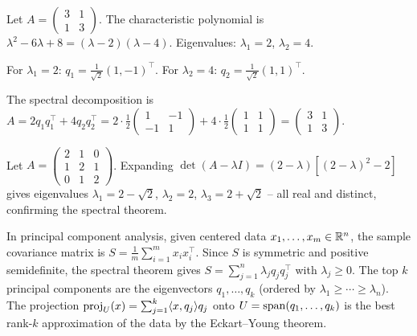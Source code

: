 \documentclass[11pt,a4paper]{article}
\begin{document}
\begin{example}
\label{ex:spectral_2x2}
Let $A = \begin{pmatrix} 3 & 1 \\ 1 & 3 \end{pmatrix}$.  The
characteristic polynomial is $\lambda^2 - 6\lambda + 8 = (\lambda-2)(\lambda-4)$.
Eigenvalues: $\lambda_1 = 2$, $\lambda_2 = 4$.

For $\lambda_1 = 2$: $q_1 = \frac{1}{\sqrt{2}}(1, -1)^\top$.
For $\lambda_2 = 4$: $q_2 = \frac{1}{\sqrt{2}}(1, 1)^\top$.

The spectral decomposition is
$A = 2 q_1 q_1^\top + 4 q_2 q_2^\top
= 2 \cdot \frac{1}{2}\begin{pmatrix} 1 & -1 \\ -1 & 1 \end{pmatrix}
+ 4 \cdot \frac{1}{2}\begin{pmatrix} 1 & 1 \\ 1 & 1 \end{pmatrix}
= \begin{pmatrix} 3 & 1 \\ 1 & 3 \end{pmatrix}$.
\end{example}

\begin{example}
\label{ex:spectral_3x3}
Let $A = \begin{pmatrix} 2 & 1 & 0 \\ 1 & 2 & 1 \\ 0 & 1 & 2 \end{pmatrix}$.
Expanding $\det(A - \lambda I) = (2-\lambda)[(2-\lambda)^2 - 2]$ gives
eigenvalues $\lambda_1 = 2 - \sqrt{2}$, $\lambda_2 = 2$,
$\lambda_3 = 2 + \sqrt{2}$ -- all real and distinct, confirming the
spectral theorem.
\end{example}

\begin{rlconnection}[title={PCA and Spectral Decomposition}]
In principal component analysis, given centered data
$x_1, \ldots, x_m \in \mathbb{R}^n$, the sample covariance matrix is
$S = \frac{1}{m}\sum_{i=1}^m x_i x_i^\top$.  Since $S$ is symmetric
and positive semidefinite, the spectral theorem gives
$S = \sum_{j=1}^n \lambda_j q_j q_j^\top$ with $\lambda_j \geq 0$.
The top $k$ principal components are the eigenvectors
$q_1, \ldots, q_k$ (ordered by $\lambda_1 \geq \cdots \geq \lambda_n$).
The projection $\operatorname{proj}_U(x) = \sum_{j=1}^k \langle x, q_j \rangle q_j$
onto $U = \operatorname{span}(q_1, \ldots, q_k)$ is the best rank-$k$ approximation
of the data by the Eckart--Young theorem.
\end{rlconnection}
\end{document}
